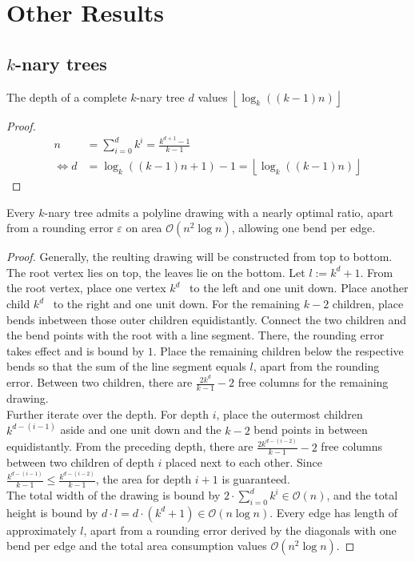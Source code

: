 \section{Other Results}

\subsection{$k$-nary trees}
\begin{lemma}The depth of a complete $k$-nary tree $d$ values $\left\lfloor\log_k((k-1)n)\right\rfloor$
\end{lemma}
\begin{proof}
	\begin{align}
		n &= \sum_{i=0}^{d}k^i = \frac{k^{d+1}-1}{k-1}\\
		\Leftrightarrow d &= \log_k((k-1)n+1)-1 = \left\lfloor\log_k((k-1)n)\right\rfloor
	\end{align}
\end{proof}

\begin{theorem}
	Every $k$-nary tree admits a polyline drawing with a nearly optimal ratio, apart from a rounding error $\varepsilon$ on area $\mathcal{O}(n^2\log n)$, allowing one bend per edge.
\end{theorem}
\begin{proof}
	Generally, the reulting drawing will be constructed from top to bottom. The root vertex lies on top, the leaves lie on the bottom. Let $l := k^d +1$. From the root vertex, place one vertex $k^d $ \UL~to the left and one unit down. Place another child $k^d$ \UL~to the right and one unit down. For the remaining $k-2$ children, place bends inbetween those outer children equidistantly. Connect the two children and the bend points with the root with a line segment. There, the rounding error takes effect and is bound by $1$. Place the remaining children below the respective bends so that the sum of the line segment equals $l$, apart from the rounding error. Between two children, there are $\frac{2k^d}{k-1}-2$ free columns for the remaining drawing.\\
	Further iterate over the depth. For depth $i$, place the outermost children $k^{d-(i-1)}$ aside and one unit down and the $k-2$ bend points in between equidistantly. From the preceding depth, there are $\frac{2k^{d-(i-2)}}{k-1}-2$ free columns between two children of depth $i$ placed next to each other. Since $\frac{k^{d-(i-1)}}{k-1}\leq \frac{k^{d-(i-2)}}{k-1}$, the area for depth $i+1$ is guaranteed.\\
	The total width of the drawing is bound by $2\cdot \sum_{i=0}^{d}k^i \in \mathcal{O}(n)$, and the total height is bound by $d\cdot l = d\cdot (k^d+1) \in \mathcal{O}(n \log n)$. Every edge has length of approximately $l$, apart from a rounding error derived by the diagonals with one bend per edge and the total area consumption values $\mathcal{O}(n^2\log n)$.
\end{proof}

